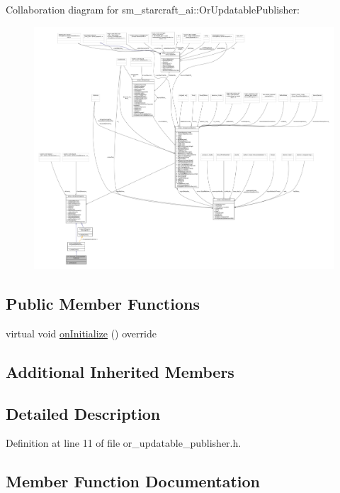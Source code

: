 Collaboration diagram for sm\+\_\+starcraft\+\_\+ai\+:\+:Or\+Updatable\+Publisher\+:
\nopagebreak
\begin{figure}[H]
\begin{center}
\leavevmode
\includegraphics[width=350pt]{classsm__starcraft__ai_1_1OrUpdatablePublisher__coll__graph}
\end{center}
\end{figure}
\subsection*{Public Member Functions}
\begin{DoxyCompactItemize}
\item 
virtual void \hyperlink{classsm__starcraft__ai_1_1OrUpdatablePublisher_a349747bdf330b39d76871cd49d36d0eb}{on\+Initialize} () override
\end{DoxyCompactItemize}
\subsection*{Additional Inherited Members}


\subsection{Detailed Description}


Definition at line 11 of file or\+\_\+updatable\+\_\+publisher.\+h.



\subsection{Member Function Documentation}
\mbox{\label{classsm__starcraft__ai_1_1OrUpdatablePublisher_a349747bdf330b39d76871cd49d36d0eb}} 
